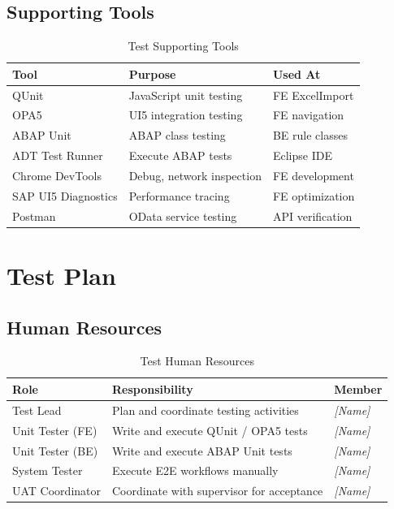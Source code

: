\documentclass[12pt,a4paper]{report}
\newcommand{\placeholder}[1]{\textcolor{placeholderblue}{\textit{[#1]}}}
\begin{document}
\subsection{Supporting Tools}

\begin{table}[H]
\centering\small
\begin{tabularx}{\textwidth}{|l|X|l|}
  \hline
  \rowcolor{tableheadpeach}
  \textbf{Tool} & \textbf{Purpose} & \textbf{Used At} \\ \hline
  QUnit              & JavaScript unit testing      & FE ExcelImport \\ \hline
  OPA5               & UI5 integration testing      & FE navigation \\ \hline
  ABAP Unit          & ABAP class testing           & BE rule classes \\ \hline
  ADT Test Runner    & Execute ABAP tests           & Eclipse IDE \\ \hline
  Chrome DevTools    & Debug, network inspection    & FE development \\ \hline
  SAP UI5 Diagnostics& Performance tracing          & FE optimization \\ \hline
  Postman            & OData service testing        & API verification \\ \hline
\end{tabularx}
\caption{Test Supporting Tools}
\label{tab:test-tools}
\end{table}


\section{Test Plan}

\subsection{Human Resources}

\begin{table}[H]
\centering\small
\begin{tabularx}{\textwidth}{|l|X|l|}
  \hline
  \rowcolor{tableheadpeach}
  \textbf{Role} & \textbf{Responsibility} & \textbf{Member} \\ \hline
  Test Lead        & Plan and coordinate testing activities       & \placeholder{Name} \\ \hline
  Unit Tester (FE) & Write and execute QUnit / OPA5 tests        & \placeholder{Name} \\ \hline
  Unit Tester (BE) & Write and execute ABAP Unit tests           & \placeholder{Name} \\ \hline
  System Tester    & Execute E2E workflows manually              & \placeholder{Name} \\ \hline
  UAT Coordinator  & Coordinate with supervisor for acceptance   & \placeholder{Name} \\ \hline
\end{tabularx}
\caption{Test Human Resources}
\label{tab:test-hr}
\end{table}
\end{document}
